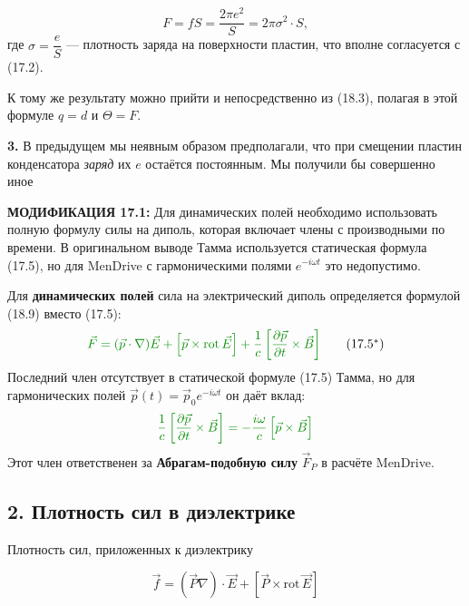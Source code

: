 \documentclass[a4paper,12pt]{article}
\newcommand{\modtext}[1]{\textcolor{modcolor}{#1}}
\newcommand{\modmath}[1]{\textcolor{modcolor}{#1}}
\newcommand{\modblock}[1]{\colorbox{modcolor!10}{\parbox{\dimexpr\linewidth-2\fboxsep}{#1}}}
\begin{document}
\begin{equation}
F = fS = \frac{2\pi e^2}{S} = 2\pi\sigma^2\cdot S,
\end{equation}
где $\sigma = \dfrac{e}{S}$ — плотность заряда на поверхности пластин,
что вполне согласуется с (17.2).

К тому же результату можно прийти и непосредственно из (18.3),
полагая в этой формуле $q = d$ и $\Theta = F$.

\textbf{3.} В предыдущем мы неявным образом предполагали, что при
смещении пластин конденсатора \textit{заряд} их $e$ остаётся
постоянным. Мы получили бы совершенно иное

\modtext{
    \textbf{МОДИФИКАЦИЯ 17.1:} Для динамических полей необходимо использовать
    полную формулу силы на диполь, которая включает члены с производными по времени.
    В оригинальном выводе Тамма используется статическая формула (17.5), но для
    MenDrive с гармоническими полями $e^{-i\omega t}$ это недопустимо.
}

\modblock{
\modtext{
    Для \textbf{динамических полей} сила на электрический диполь определяется
    формулой (18.9) вместо (17.5):
    \begin{equation}
    \modmath{
        \vec{F} = (\vec{p}\cdot\nabla)\vec{E} +
        \left[\vec{p} \times \text{rot}\,\vec{E}\right] +
        \frac{1}{c}\left[\frac{\partial\vec{p}}{\partial t} \times \vec{B}\right]
    }
    \tag{17.5$^*$}
    \end{equation}
    Последний член отсутствует в статической формуле (17.5) Тамма, но для
    гармонических полей $\vec{p}(t) = \vec{p}_0 e^{-i\omega t}$ он даёт вклад:
    \begin{equation}
    \modmath{
        \frac{1}{c}\left[\frac{\partial\vec{p}}{\partial t} \times \vec{B}\right] =
        -\frac{i\omega}{c}\left[\vec{p} \times \vec{B}\right]
    }
    \end{equation}
    Этот член ответственен за \textbf{Абрагам-подобную силу} $\vec{F}_P$ в расчёте
    MenDrive.
}
}

\subsection*{2. Плотность сил в диэлектрике}

\noindent
Плотность сил, приложенных к диэлектрику

\begin{equation}
\vec{f} = \left(\vec{P}\nabla\right)\cdot\vec{E} + \left[\vec{P} \times \text{rot}\,\vec{E}\right]
\tag{17.6}
\end{equation}
\end{document}
